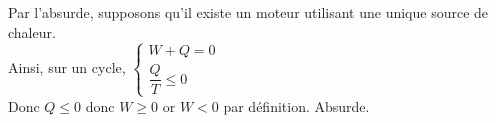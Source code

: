 ﻿\documentclass[a4paper]{article}
\begin{document}
\pagestyle{fancy}
\fancyhf{}
\setlength{\headheight}{15pt}

\begin{center}
	\large{}
\end{center}


Par l'absurde, supposons qu'il existe un moteur utilisant une unique source de chaleur.\\
Ainsi, sur un cycle, \(\left\lbrace \begin{array}{l} W+Q=0 \\ \dfrac{Q}{T}\leqslant 0 \end{array}\right.\)\\
Donc \(Q\leqslant0\) donc \(W\geqslant0\) or \(W<0\) par définition. Absurde.
\begin{center}
\end{center}
\end{document}
